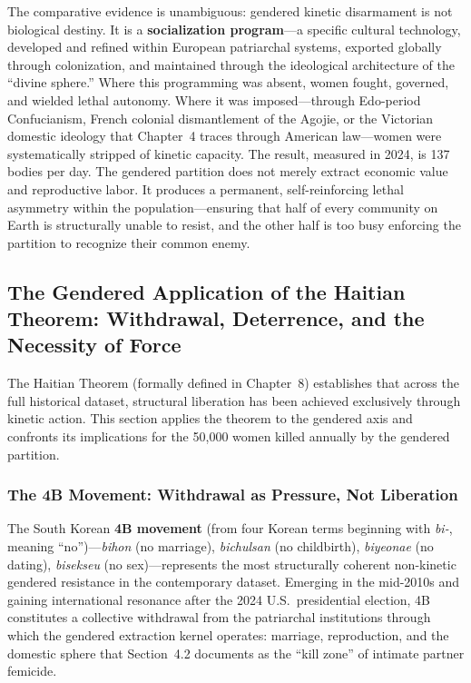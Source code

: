 \documentclass[12pt,openany]{book}
\begin{document}
The comparative evidence is unambiguous: gendered kinetic disarmament is not biological destiny. It is a \textbf{socialization program}---a specific cultural technology, developed and refined within European patriarchal systems, exported globally through colonization, and maintained through the ideological architecture of the ``divine sphere.'' Where this programming was absent, women fought, governed, and wielded lethal autonomy. Where it was imposed---through Edo-period Confucianism, French colonial dismantlement of the Agojie, or the Victorian domestic ideology that Chapter~4 traces through American law---women were systematically stripped of kinetic capacity. The result, measured in 2024, is 137 bodies per day. The gendered partition does not merely extract economic value and reproductive labor. It produces a permanent, self-reinforcing lethal asymmetry within the population---ensuring that half of every community on Earth is structurally unable to resist, and the other half is too busy enforcing the partition to recognize their common enemy.

\subsection{The Gendered Application of the Haitian Theorem: Withdrawal, Deterrence, and the Necessity of Force}

The Haitian Theorem (formally defined in Chapter~8) establishes that across the full historical dataset, structural liberation has been achieved exclusively through kinetic action. This section applies the theorem to the gendered axis and confronts its implications for the 50,000 women killed annually by the gendered partition.

\subsubsection{The 4B Movement: Withdrawal as Pressure, Not Liberation}

The South Korean \textbf{4B movement} (from four Korean terms beginning with \textit{bi-}, meaning ``no'')---\textit{bihon} (no marriage), \textit{bichulsan} (no childbirth), \textit{biyeonae} (no dating), \textit{bisekseu} (no sex)---represents the most structurally coherent non-kinetic gendered resistance in the contemporary dataset. Emerging in the mid-2010s and gaining international resonance after the 2024 U.S.\ presidential election, 4B constitutes a collective withdrawal from the patriarchal institutions through which the gendered extraction kernel operates: marriage, reproduction, and the domestic sphere that Section~4.2 documents as the ``kill zone'' of intimate partner femicide.
\end{document}
